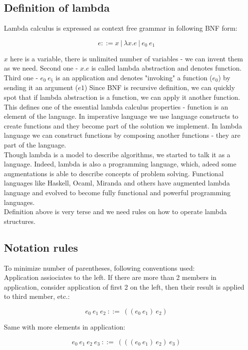 \subsection{Definition of lambda}

Lambda calculus is expressed as context free grammar in following BNF form:

\[ e ::= x \ | \ \lambda{x}.{e} \ | \  e_0~e_1 \]

$x$ here is a variable, there is unlimited number of variables - we can invent them as we need. Second one - \lam${x}.{e}$ 
is called lambda abstraction and denotes function. Third one - $e_0~e_§$ is an application and denotes "invoking" a function ($e_0$)
by sending it an argument ($e1$)
Since BNF is recursive definition, we can quickly spot that if lambda abstraction is a function, we can apply it another function.
This defines one of the essential lambda calculus properties - function is an element of the language. In imperative language we use
language constructs to create functions and they become part of the solution we implement. In lambda language we can construct 
functions by composing another functions - they are part of the language.
\\
Though lambda is a model to describe algorithms, we started to talk it as a language. Indeed, lambda is also a programming language,
which, adeed some augmentations is able to describe concepts of problem solving. Functional languages like Haskell, Ocaml, Miranda and others
have augmented lambda language and evolved to become fully functional and powerful programming languages.
\\
Definition above is very terse and we need rules on how to operate lambda structures.

\subsection{Notation rules}

To minimize number of parentheses, following conventions used:
\\Application assiociates to the left. If there are more than 2 members in application, consider application of first 2 on the left, then their
result is applied to third member, etc.:

\[e_0\ e_1\ e_2\ ::=\ ((e_0\ e_1)\ e_2)\]

Same with more elements in application:

\[e_0\ e_1\ e_2\ e_3\ ::=\ (((e_0\ e_1)\ e_2)\ e_3)\]

